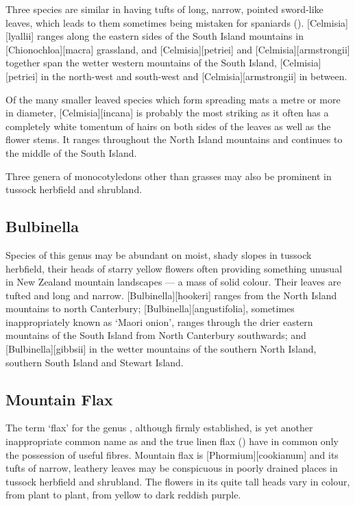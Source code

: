 Three species are similar in having tufts of long, narrow, pointed sword-like leaves, which leads to them sometimes being mistaken for spaniards (). [Celmisia][lyallii] ranges along the eastern sides of the South Island mountains in [Chionochloa][macra] grassland, and [Celmisia][petriei]  and [Celmisia][armstrongii]  together span the wetter western mountains of the South Island, [Celmisia][petriei]  in the north-west and south-west and [Celmisia][armstrongii]  in between.

Of the many smaller leaved species which form spreading mats a metre or more in diameter, [Celmisia][incana] is probably the most striking as it often has a completely white tomentum of hairs on both sides of the leaves as well as the flower stems.
It ranges throughout the North Island mountains and continues to the middle of the South Island.

Three genera of monocotyledons other than grasses may also be prominent in tussock herbfield and shrubland.

\subsection{Bulbinella}

Species of this genus may be abundant on moist, shady slopes in tussock herbfield, their heads of starry yellow flowers often providing something unusual in New Zealand mountain landscapes --- a mass of solid colour.
Their leaves are tufted and long and narrow. [Bulbinella][hookeri] ranges from the North Island mountains to north Canterbury; [Bulbinella][angustifolia], sometimes inappropriately known as `Maori onion', ranges through the drier eastern mountains of the South Island from North Canterbury southwards; and [Bulbinella][gibbsii] in the wetter mountains of the southern North Island, southern South Island and Stewart Island.

\subsection{Mountain Flax}

The term `flax' for the genus , although firmly established, is yet another inappropriate common name as  and the true linen flax () have in common only the possession of useful fibres.
Mountain flax is [Phormium][cookianum] and its tufts of narrow, leathery leaves may be conspicuous in poorly drained places in tussock herbfield and shrubland.
The flowers in its quite tall heads vary in colour, from plant to plant, from yellow to dark reddish purple.

